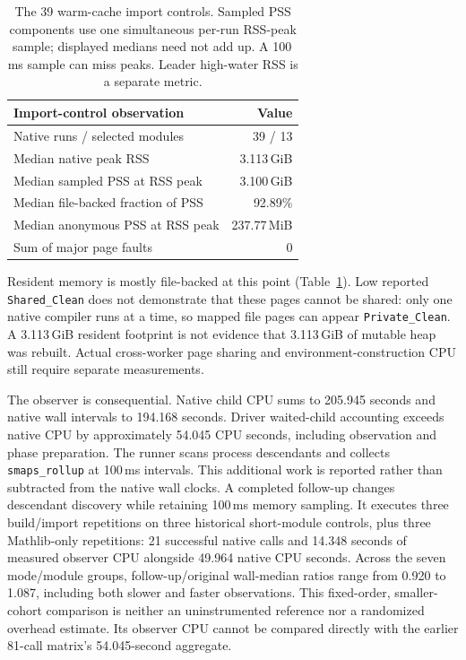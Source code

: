 \documentclass[10pt,twocolumn]{article}
\begin{document}
\begin{table}[t]
\centering\small
\begin{tabular}{@{}lr@{}}
\toprule
Import-control observation & Value\\
\midrule
Native runs / selected modules &39 / 13\\
Median native peak RSS &3.113\,GiB\\
Median sampled PSS at RSS peak &3.100\,GiB\\
Median file-backed fraction of PSS &92.89\%\\
Median anonymous PSS at RSS peak &237.77\,MiB\\
Sum of major page faults &0\\
\bottomrule
\end{tabular}
\caption{The 39 warm-cache import controls. Sampled PSS components use one
simultaneous per-run RSS-peak sample; displayed medians need not add up.
A 100\,ms sample can miss peaks. Leader high-water RSS is a separate metric.}
\label{tab:import-memory}
\end{table}

Resident memory is mostly file-backed at this point
(Table~\ref{tab:import-memory}). Low reported \texttt{Shared\_Clean}
does not demonstrate that these pages cannot be shared: only one native
compiler runs at a time, so mapped file pages can appear
\texttt{Private\_Clean}. A 3.113\,GiB resident footprint is not evidence
that 3.113\,GiB of mutable heap was rebuilt.
Actual cross-worker page sharing and environment-construction CPU
still require separate measurements.

The observer is consequential. Native child CPU sums to 205.945 seconds
and native wall intervals to 194.168 seconds.
Driver waited-child accounting exceeds native CPU by approximately
54.045 CPU seconds, including observation and phase preparation.
The runner scans process descendants and collects \texttt{smaps\_rollup}
at 100\,ms intervals. This additional work is reported rather than
subtracted from the native wall clocks.
A completed follow-up changes descendant discovery while retaining
100\,ms memory sampling. It executes three build/import repetitions on
three historical short-module controls, plus three Mathlib-only repetitions:
21 successful native calls and 14.348 seconds of measured observer CPU
alongside 49.964 native CPU seconds.
Across the seven mode/module groups, follow-up/original wall-median ratios
range from 0.920 to 1.087, including both slower and faster observations.
This fixed-order, smaller-cohort comparison is neither an uninstrumented
reference nor a randomized overhead estimate. Its observer CPU cannot be
compared directly with the earlier 81-call matrix's 54.045-second aggregate.
\end{document}
